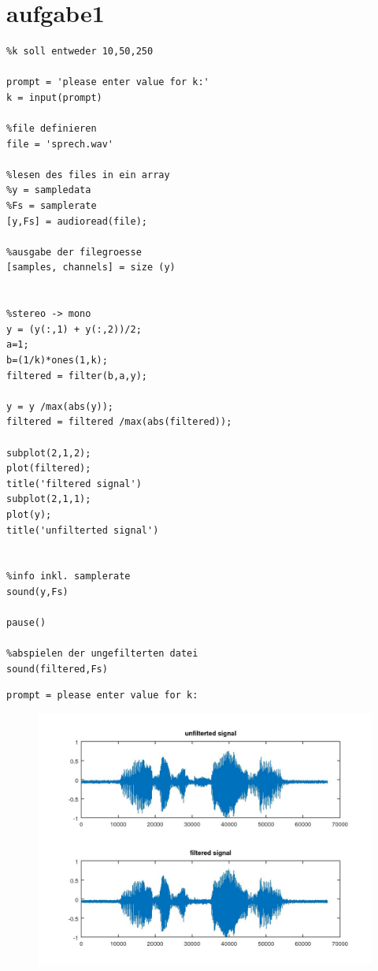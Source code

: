 \documentclass[10pt]{article}
\begin{document}
{\Huge\section*{aufgabe1}}

\tableofcontents
\vspace*{4em}

\begin{lstlisting}
%k soll entweder 10,50,250

prompt = 'please enter value for k:'
k = input(prompt)

%file definieren
file = 'sprech.wav'

%lesen des files in ein array
%y = sampledata
%Fs = samplerate
[y,Fs] = audioread(file);

%ausgabe der filegroesse
[samples, channels] = size (y)


%stereo -> mono
y = (y(:,1) + y(:,2))/2;
a=1;
b=(1/k)*ones(1,k);
filtered = filter(b,a,y);

y = y /max(abs(y));
filtered = filtered /max(abs(filtered));

subplot(2,1,2);
plot(filtered);
title('filtered signal')
subplot(2,1,1);
plot(y);
title('unfilterted signal')


%info inkl. samplerate
sound(y,Fs)

pause()

%abspielen der ungefilterten datei
sound(filtered,Fs)
\end{lstlisting}
\begin{lstlisting}[language={},xleftmargin=5pt,frame=none]
prompt = please enter value for k:

\end{lstlisting}
\begin{figure}[!ht]
\includegraphics[width=\textwidth]{aufgabe1-1.jpg}
\end{figure}
\end{document}
